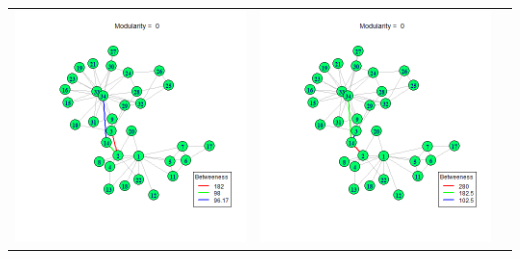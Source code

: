 \documentclass[letterpaper,11pt]{report}
\begin{document}
\begin{savenotes}
\begin{table}[htbp]
\begin{tabular}{ccc}
			\includegraphics[scale=0.28]{karateClub-community-0011.png} & 
			\includegraphics[scale=0.28]{karateClub-community-0012.png} \\

\end{tabular}
\end{table}
\end{savenotes}
\end{document}
